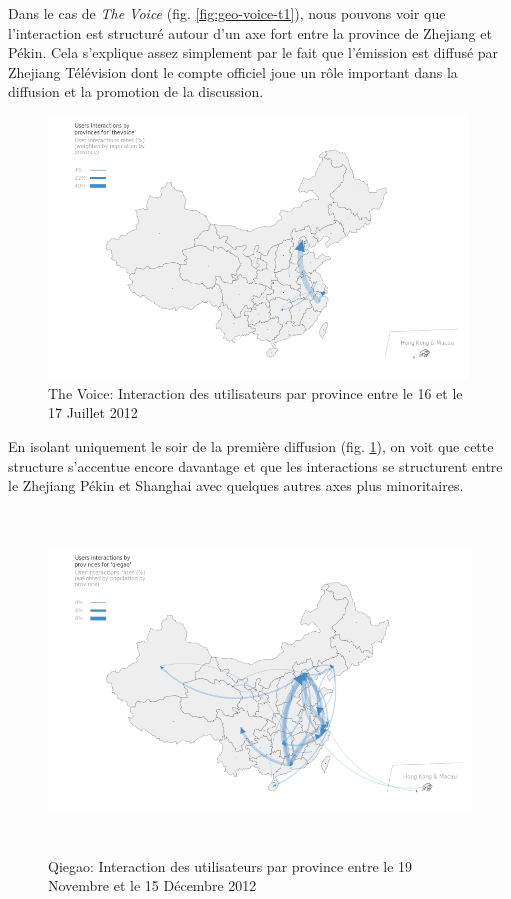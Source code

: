 Dans le cas de \textit{The Voice} (fig. \ref{fig:geo-voice-t1}), nous pouvons voir que
l{\textquoteright}interaction est structur\'e autour
d{\textquoteright}un axe fort entre la province de Zhejiang et P\'ekin.
Cela s{\textquoteright}explique assez simplement par le fait que
l{\textquoteright}\'emission est diffus\'e par Zhejiang T\'el\'evision
dont le compte officiel joue un r\^ole important dans la diffusion et
la promotion de la discussion.

\begin{figure}[H]
    \centering
    \includegraphics[width=4.3858in,height=2.7413in]{figures/chap4/chapitre4-img20.png}    
    \caption{
      The Voice: Interaction des utilisateurs par province entre le 16 et le 17 Juillet 2012
    }
    \label{fig:geo-voice-t2}
\end{figure}

En isolant uniquement le soir de la premi\`ere diffusion (fig. \ref{fig:geo-voice-t2}), on voit que
cette structure s{\textquoteright}accentue encore davantage et que les
interactions se structurent entre le Zhejiang P\'ekin et Shanghai avec
quelques autres axes plus minoritaires.

\begin{figure}[H]
    \centering
    \includegraphics[width=5.7059in,height=3.5661in]{figures/chap4/chapitre4-img21.png}
    \caption{
      Qiegao: Interaction des utilisateurs par province entre le 19 Novembre et le 15 D\'ecembre 2012
    }
    \label{fig:geo-qiegao-t0}
\end{figure}


